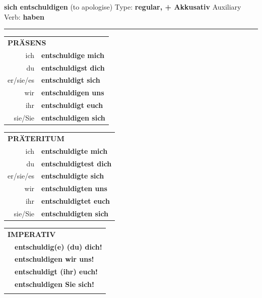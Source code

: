 \documentclass[10pt,a4paper]{revtex4-2}
\begin{document}
\begin{verbbox-acc}
        {\Large \bf sich entschuldigen} (to apologise) \hfill Type: \textbf{regular, + Akkusativ} \hfill Auxiliary Verb: \textbf{haben} 
    
       \vspace{5pt}

    \hrule
    
    \vspace{5pt}

  \begin{tabular}{rl}
     \multicolumn{2}{l}{\textbf{PRÄSENS} }\\
    ich & \textbf{entschuldige mich}\\
    du & \textbf{entschuldigst dich}\\
    er/sie/es & \textbf{entschuldigt sich}\\
    wir & \textbf{entschuldigen uns}\\
    ihr & \textbf{entschuldigt euch}\\
    sie/Sie & \textbf{entschuldigen sich}\\
  \end{tabular}
  \hfill
     \begin{tabular}{rl}
    \multicolumn{2}{l}{\textbf{PRÄTERITUM} }\\
    ich & \textbf{entschuldigte mich}\\
    du & \textbf{entschuldigtest dich}\\
    er/sie/es & \textbf{entschuldigte sich}\\
    wir & \textbf{entschuldigten uns}\\
    ihr & \textbf{entschuldigtet euch}\\
    sie/Sie & \textbf{entschuldigten sich}\\
  \end{tabular}
  \hfill
  \begin{tabular}{rl}
     \multicolumn{2}{l}{\textbf{IMPERATIV} }\\
   & \textbf{entschuldig(e) (du) dich!}\\
   & \textbf{entschuldigen wir uns!}\\
   & \textbf{entschuldigt (ihr) euch!}\\
   & \textbf{entschuldigen Sie sich!}\\
   & \vspace{10pt}
  \end{tabular}


\end{verbbox-acc}
\end{document}

